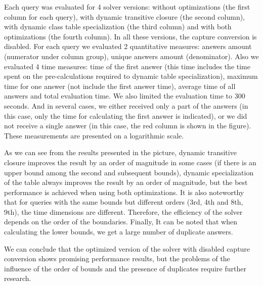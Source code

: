 Each query was evaluated for 4 solver versions: without optimizations (the first column for each query), with dynamic transitive closure (the second column), with dynamic class table specialization (the third column) and with both optimizations (the fourth column). In all these versions, the capture conversion is disabled.
For each query we evaluated 2 quantitative measures: answers amount (numerator under column group), unique answers amount (denominator). Also we evaluated 4 time measures: time of the first answer (this time includes the time spent on the pre-calculations required to dynamic table specialization), maximum time for one answer (not include the first answer time), average time of all answers and total evaluation time. We also limited the evaluation time to 300 seconds. And in several cases, we either received only a part of the answers (in this case, only the time for calculating the first answer is indicated), or we did not receive a single answer (in this case, the red column is shown in the figure). These measurements are presented on a logarithmic scale.

As we can see from the results presented in the picture, dynamic transitive closure improves the result by an order of magnitude in some cases (if there is an upper bound among the second and subsequent bounds), dynamic specialization of the table always improves the result by an order of magnitude, but the best performance is achieved when using both optimizations. It is also noteworthy that for queries with the same bounds but different orders (3rd, 4th and 8th, 9th), the time dimensions are different. Therefore, the efficiency of the solver depends on the order of the boundaries. Finally, It can be noted that when calculating the lower bounds, we get a large number of duplicate answers.

We can conclude that the optimized version of the solver with disabled capture conversion shows promising performance results, but the problems of the influence of the order of bounds and the presence of duplicates require further research.

